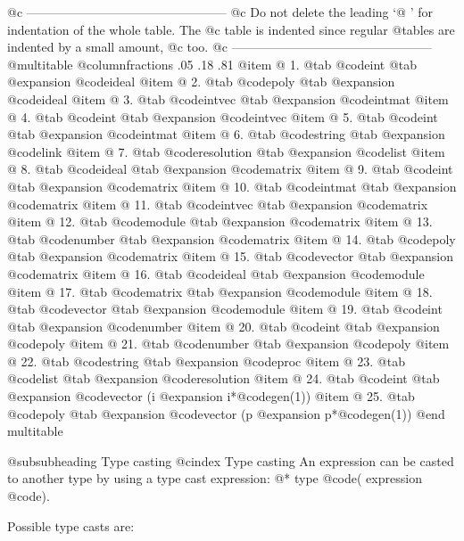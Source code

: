 {{{@c ------------------------------------------------
@c Do not delete the leading `@ ' for indentation of the whole table.  The
@c table is indented since regular @tables are indented by a small amount,
@c too.
@c ------------------------------------------------
@multitable @columnfractions .05 .18 .81
@item
@   1. @tab @code{int}  @tab @expansion{} @code{ideal}
@item
@   2. @tab @code{poly}  @tab @expansion{} @code{ideal}
@item
@   3. @tab @code{intvec}  @tab @expansion{} @code{intmat}
@item
@   4. @tab @code{int}  @tab @expansion{} @code{intvec}
@item
@   5. @tab @code{int}  @tab @expansion{} @code{intmat}
@item
@   6. @tab @code{string}  @tab @expansion{} @code{link}
@item
@   7. @tab @code{resolution} @tab @expansion{} @code{list}
@item
@   8. @tab @code{ideal}  @tab @expansion{} @code{matrix}
@item
@   9. @tab @code{int}  @tab @expansion{} @code{matrix}
@item
@  10. @tab @code{intmat}  @tab @expansion{} @code{matrix}
@item
@  11. @tab @code{intvec}  @tab @expansion{} @code{matrix}
@item
@  12. @tab @code{module}  @tab @expansion{} @code{matrix}
@item
@  13. @tab @code{number}  @tab @expansion{} @code{matrix}
@item
@  14. @tab @code{poly}  @tab @expansion{} @code{matrix}
@item
@  15. @tab @code{vector}  @tab @expansion{} @code{matrix}
@item
@  16. @tab @code{ideal}  @tab @expansion{} @code{module}
@item
@  17. @tab @code{matrix}  @tab @expansion{} @code{module}
@item
@  18. @tab @code{vector}  @tab @expansion{} @code{module}
@item
@  19. @tab @code{int}  @tab @expansion{} @code{number}
@item
@  20. @tab @code{int}  @tab @expansion{} @code{poly}
@item
@  21. @tab @code{number}  @tab @expansion{} @code{poly}
@item
@  22. @tab @code{string}  @tab @expansion{} @code{proc}
@item
@  23. @tab @code{list}  @tab @expansion{} @code{resolution}
@item
@  24. @tab @code{int}  @tab @expansion{} @code{vector}
  (i @expansion{} i*@code{gen(1)})
@item
@  25. @tab @code{poly}  @tab @expansion{} @code{vector}
  (p @expansion{} p*@code{gen(1)})
@end multitable

@subsubheading Type casting
@cindex Type casting
An expression can be casted to another type by using a type cast
expression:
@* type @code{(} expression @code{)}.

Possible type casts are:

}}}
